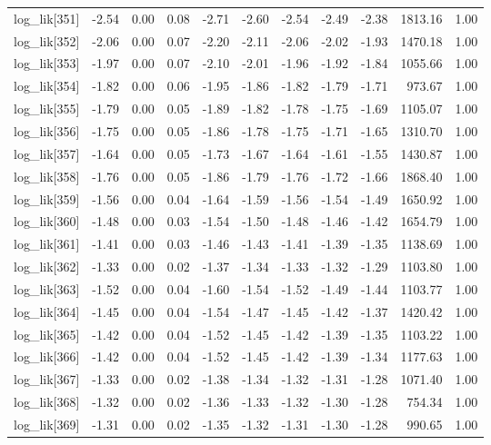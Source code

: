 \begin{table}[ht]
\begin{tabular}{rrrrrrrrrrr}
  log\_lik[351] & -2.54 & 0.00 & 0.08 & -2.71 & -2.60 & -2.54 & -2.49 & -2.38 & 1813.16 & 1.00 \\ 
  log\_lik[352] & -2.06 & 0.00 & 0.07 & -2.20 & -2.11 & -2.06 & -2.02 & -1.93 & 1470.18 & 1.00 \\ 
  log\_lik[353] & -1.97 & 0.00 & 0.07 & -2.10 & -2.01 & -1.96 & -1.92 & -1.84 & 1055.66 & 1.00 \\ 
  log\_lik[354] & -1.82 & 0.00 & 0.06 & -1.95 & -1.86 & -1.82 & -1.79 & -1.71 & 973.67 & 1.00 \\ 
  log\_lik[355] & -1.79 & 0.00 & 0.05 & -1.89 & -1.82 & -1.78 & -1.75 & -1.69 & 1105.07 & 1.00 \\ 
  log\_lik[356] & -1.75 & 0.00 & 0.05 & -1.86 & -1.78 & -1.75 & -1.71 & -1.65 & 1310.70 & 1.00 \\ 
  log\_lik[357] & -1.64 & 0.00 & 0.05 & -1.73 & -1.67 & -1.64 & -1.61 & -1.55 & 1430.87 & 1.00 \\ 
  log\_lik[358] & -1.76 & 0.00 & 0.05 & -1.86 & -1.79 & -1.76 & -1.72 & -1.66 & 1868.40 & 1.00 \\ 
  log\_lik[359] & -1.56 & 0.00 & 0.04 & -1.64 & -1.59 & -1.56 & -1.54 & -1.49 & 1650.92 & 1.00 \\ 
  log\_lik[360] & -1.48 & 0.00 & 0.03 & -1.54 & -1.50 & -1.48 & -1.46 & -1.42 & 1654.79 & 1.00 \\ 
  log\_lik[361] & -1.41 & 0.00 & 0.03 & -1.46 & -1.43 & -1.41 & -1.39 & -1.35 & 1138.69 & 1.00 \\ 
  log\_lik[362] & -1.33 & 0.00 & 0.02 & -1.37 & -1.34 & -1.33 & -1.32 & -1.29 & 1103.80 & 1.00 \\ 
  log\_lik[363] & -1.52 & 0.00 & 0.04 & -1.60 & -1.54 & -1.52 & -1.49 & -1.44 & 1103.77 & 1.00 \\ 
  log\_lik[364] & -1.45 & 0.00 & 0.04 & -1.54 & -1.47 & -1.45 & -1.42 & -1.37 & 1420.42 & 1.00 \\ 
  log\_lik[365] & -1.42 & 0.00 & 0.04 & -1.52 & -1.45 & -1.42 & -1.39 & -1.35 & 1103.22 & 1.00 \\ 
  log\_lik[366] & -1.42 & 0.00 & 0.04 & -1.52 & -1.45 & -1.42 & -1.39 & -1.34 & 1177.63 & 1.00 \\ 
  log\_lik[367] & -1.33 & 0.00 & 0.02 & -1.38 & -1.34 & -1.32 & -1.31 & -1.28 & 1071.40 & 1.00 \\ 
  log\_lik[368] & -1.32 & 0.00 & 0.02 & -1.36 & -1.33 & -1.32 & -1.30 & -1.28 & 754.34 & 1.00 \\ 
  log\_lik[369] & -1.31 & 0.00 & 0.02 & -1.35 & -1.32 & -1.31 & -1.30 & -1.28 & 990.65 & 1.00 \\ 

\end{tabular}
\end{table}

